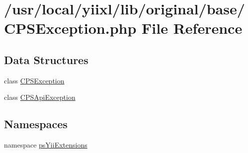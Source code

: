 \hypertarget{CPSException_8php}{
\section{/usr/local/yiixl/lib/original/base/CPSException.php File Reference}
\label{CPSException_8php}
}
\subsection*{Data Structures}
\begin{DoxyCompactItemize}
\item 
class \hyperlink{classCPSException}{CPSException}
\item 
class \hyperlink{classCPSApiException}{CPSApiException}
\end{DoxyCompactItemize}
\subsection*{Namespaces}
\begin{DoxyCompactItemize}
\item 
namespace \hyperlink{namespacepsYiiExtensions}{psYiiExtensions}
\end{DoxyCompactItemize}
